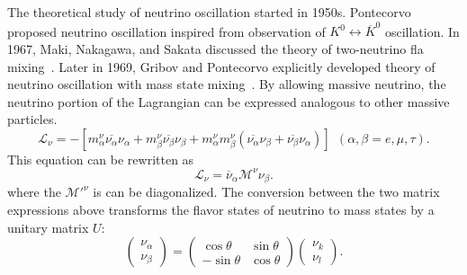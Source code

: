     The theoretical study of neutrino oscillation started in 1950s.
    Pontecorvo~\cite{bib:Pontecorvo1957, bib:Pontecorvo1957qd} proposed neutrino oscillation inspired from observation of $K^0 \leftrightarrow \overline{K}^0$ oscillation.
    In 1967, Maki, Nakagawa, and Sakata discussed the theory of two-neutrino fla mixing~\cite{bib:Maki1962}.
    Later in 1969, Gribov and Pontecorvo explicitly developed theory of neutrino oscillation with mass state mixing~\cite{bib:GRIBOV1969}. 
    By allowing massive neutrino, the neutrino portion of the Lagrangian can be expressed analogous to other massive particles.
\begin{equation}
\label{eq13}
\mathscr{L}_\nu = -\left[m^\nu_\alpha\overline{\nu_\alpha}\nu_\alpha + m^\nu_\beta\overline{\nu_\beta}\nu_\beta + m^\nu_\alpha m^\nu_\beta(\overline{\nu_\alpha}\nu_\beta + \overline{\nu_\beta}\nu_\alpha) \right] \   \ (\alpha, \beta = e, \mu, \tau).
\end{equation}
    This equation can be rewritten as
\begin{equation}
\label{eq14}
\mathscr{L}_\nu = \overline{\nu}_\alpha\mathcal{M}^\nu\nu_\beta.
\end{equation}
    where the $\mathcal{M}'^\nu$ is can be diagonalized. 
    The conversion between the two matrix expressions above transforms the flavor states of neutrino to mass states by a unitary matrix $U$:
\begin{equation}\label{eq15}
\left(\begin{array}{c}
\nu_\alpha \\
\nu_\beta
\end{array}\right) = \left(\begin{array}{cc}
\cos\theta & \sin\theta \\
-\sin\theta & \cos\theta
\end{array}\right)\left(\begin{array}{c}
\nu_k \\
\nu_l
\end{array}\right).
\end{equation}

